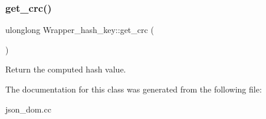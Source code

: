 \subsubsection{\texorpdfstring{get\+\_\+crc()}{get\_crc()}}
{\footnotesize\ttfamily ulonglong Wrapper\+\_\+hash\+\_\+key\+::get\+\_\+crc (\begin{DoxyParamCaption}{ }\end{DoxyParamCaption})\hspace{0.3cm}{\ttfamily [inline]}}

Return the computed hash value. 

The documentation for this class was generated from the following file\+:\begin{DoxyCompactItemize}
\item 
json\+\_\+dom.\+cc\end{DoxyCompactItemize}
